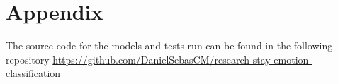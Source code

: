\chapter{Appendix}
\label{chapter:appendix}

The source code for the models and tests run can be found in the following
repository \url{https://github.com/DanielSebasCM/research-stay-emotion-classification}